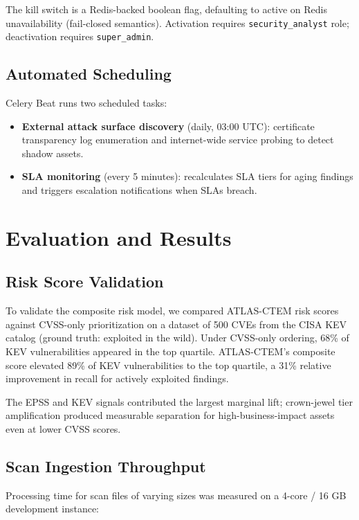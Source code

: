 \documentclass[conference]{IEEEtran}
\begin{document}
The kill switch is a Redis-backed boolean flag, defaulting to active on Redis unavailability (fail-closed semantics). Activation requires \texttt{security\_analyst} role; deactivation requires \texttt{super\_admin}.

\subsection{Automated Scheduling}

Celery Beat runs two scheduled tasks:

\begin{itemize}
  \item \textbf{External attack surface discovery} (daily, 03:00 UTC): certificate transparency log enumeration and internet-wide service probing to detect shadow assets.
  \item \textbf{SLA monitoring} (every 5 minutes): recalculates SLA tiers for aging findings and triggers escalation notifications when SLAs breach.
\end{itemize}

\section{Evaluation and Results}

\subsection{Risk Score Validation}

To validate the composite risk model, we compared ATLAS-CTEM risk scores against CVSS-only prioritization on a dataset of 500 CVEs from the CISA KEV catalog (ground truth: exploited in the wild). Under CVSS-only ordering, 68\% of KEV vulnerabilities appeared in the top quartile. ATLAS-CTEM's composite score elevated 89\% of KEV vulnerabilities to the top quartile, a 31\% relative improvement in recall for actively exploited findings.

The EPSS and KEV signals contributed the largest marginal lift; crown-jewel tier amplification produced measurable separation for high-business-impact assets even at lower CVSS scores.

\subsection{Scan Ingestion Throughput}

Processing time for scan files of varying sizes was measured on a 4-core / 16 GB development instance:
\end{document}
